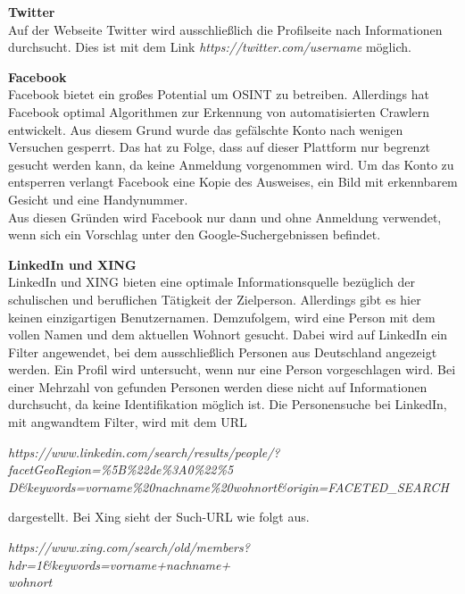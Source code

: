 			\textbf{Twitter}\\
			Auf der Webseite Twitter wird ausschließlich die Profilseite nach Informationen durchsucht. Dies ist mit dem Link \textit{https://twitter.com/username} möglich.
			
			\textbf{Facebook}\\
			Facebook bietet ein großes Potential um OSINT zu betreiben. Allerdings hat Facebook optimal Algorithmen zur Erkennung von automatisierten Crawlern entwickelt. Aus diesem Grund wurde das gefälschte Konto nach wenigen Versuchen gesperrt. Das hat zu Folge, dass auf dieser Plattform nur begrenzt gesucht werden kann, da keine Anmeldung vorgenommen wird. Um das Konto zu entsperren verlangt Facebook eine Kopie des Ausweises, ein Bild mit erkennbarem Gesicht und eine Handynummer.\\
			Aus diesen Gründen wird Facebook nur dann und ohne Anmeldung verwendet, wenn sich ein Vorschlag unter den Google-Suchergebnissen befindet.

			\textbf{LinkedIn und XING}\\
			LinkedIn und XING bieten eine optimale Informationsquelle bezüglich der schulischen und beruflichen Tätigkeit der Zielperson. Allerdings gibt es hier keinen einzigartigen Benutzernamen. Demzufolgem, wird eine Person mit dem vollen Namen und dem aktuellen Wohnort gesucht. Dabei wird auf LinkedIn ein Filter angewendet, bei dem ausschließlich Personen aus Deutschland angezeigt werden. Ein Profil wird untersucht, wenn nur eine Person vorgeschlagen wird. Bei einer Mehrzahl von gefunden Personen werden diese nicht auf Informationen durchsucht, da keine Identifikation möglich ist.
			Die Personensuche bei LinkedIn, mit angwandtem Filter, wird mit dem URL
			
			\textit{https://www.linkedin.com/search/results/people/?facetGeoRegion=\%5B\%22de\%3A0\%22\%5\\D\&keywords=vorname\%20nachname\%20wohnort\&origin=FACETED\_SEARCH} 
			
			dargestellt. Bei Xing sieht der Such-URL wie folgt aus.
						
			\textit{https://www.xing.com/search/old/members?hdr=1\&keywords=vorname+nachname+\\wohnort}
			
			
